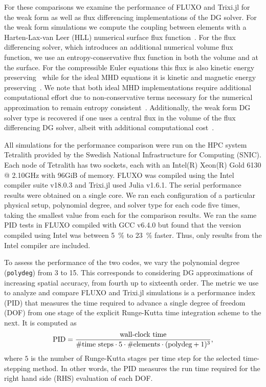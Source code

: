\documentclass[hidelinks]{juliacon} %
\newcommand{\trixi}{Trixi.jl\xspace}
\begin{document}
For these comparisons we examine the performance of FLUXO and \trixi for the weak
form as well as flux differencing implementations of the DG solver. For the weak form simulations we compute
the coupling between elements with a Harten-Lax-van Leer (HLL) numerical surface flux function~\cite{Toro2009,li2005hllc}.
For the flux differencing solver, which introduces an additional numerical volume flux function, we use an entropy-conservative flux
function in both the volume and at the surface. For the compressible Euler equations
this flux is also kinetic energy preserving~\cite{ranocha2020icosahom, ranocha2018thesis}
while for the ideal MHD equations it is kinetic and magnetic energy preserving~\cite{hindenlang2019}. We note that both ideal MHD implementations
require additional computational effort due to non-conservative terms necessary for the numerical approximation
to remain entropy consistent~\cite{bohm2020}. Additionally, the weak form DG solver type is recovered if one uses a central flux
in the volume of the flux differencing DG solver, albeit with additional computational cost~\cite{gassner2016split}.

All simulations for the performance comparison were run on the HPC system Tetralith
provided by the Swedish National Infrastructure for Computing (SNIC).
Each node of Tetralith has two sockets, each with an Intel(R) Xeon(R) Gold 6130 @ 2.10GHz with 96GiB of memory.
FLUXO was compiled using the Intel compiler suite v18.0.3 and \trixi used Julia v1.6.1.
The serial performance results were obtained on a single core.
We ran each configuration of a particular physical setup, polynomial degree, and solver type
for each code five times, taking the smallest value from each for the comparison results.
We ran the same PID tests in FLUXO compiled with GCC v6.4.0 but found that
the version compiled using Intel was between \SI{5}{\percent} to \SI{23}{\percent} faster.
Thus, only results from the Intel compiler are included.

To assess the performance of the two codes, we vary the polynomial degree
(\lstinline{polydeg}) from 3 to 15.
This corresponds to considering DG approximations of increasing spatial accuracy, from fourth up to sixteenth order.
The metric we use to analyze and compare FLUXO and \trixi simulations is a performance index (PID) that
measures the time required to advance a single degree of freedom (DOF) from one stage of the explicit Runge-Kutta
time integration scheme to the next. It is computed as
\begin{equation}
\label{eqn:pid}
\text{PID} = \frac{\text{wall-clock time}}{\#\text{time steps}\cdot 5\cdot\#\text{elements}\cdot(\text{\lstinline{polydeg}}+1)^3},
\end{equation}
where $5$ is the number of Runge-Kutta stages per time step for the selected time-stepping method. In other words, the PID
measures the run time required for the right hand side (RHS) evaluation of each DOF.
\end{document}
